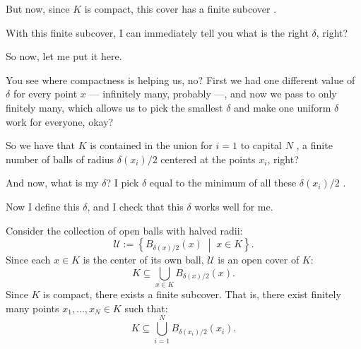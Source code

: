 \begin{proofWrapper}
\begin{speech}[01:18:10 - 01:20:08]
But now, since $K$ is compact, this cover has a finite subcover .

With this finite subcover, I can immediately tell you what is the right $\delta$, right?

So now, let me put it here.

You see where compactness is helping us, no? First we had one different value of $\delta$ for every point $x$ --- infinitely many, probably ---, and now we pass to only finitely many, which allows us to pick the smallest $\delta$ and make one uniform $\delta$ work for everyone, okay?

So we have that $K$ is contained in the union for $i = 1$ to capital $N$ , a finite number of balls of radius $\delta(x_i)/2$ centered at the points $x_i$, right?

And now, what is my $\delta$? I pick $\delta$ equal to the minimum of all these $\delta(x_i)/2$ .

Now I define this $\delta$, and I check that this $\delta$ works well for me.
\end{speech}

\begin{hidden}
\end{hidden}

\begin{content}
Consider the collection of open balls with halved radii:
\begin{equation}\label{eq:open-cover-halved}
\mathcal{U} := \left\{ B_{\delta(x)/2}(x) \;\middle|\; x \in K \right\}.
\end{equation}
Since each $x \in K$ is the center of its own ball, $\mathcal{U}$ is an open cover of $K$:
\[
K \subseteq \bigcup_{x \in K} B_{\delta(x)/2}(x).
\]
Since $K$ is compact, there exists a finite subcover. That is, there exist finitely many points $x_1, \dots, x_N \in K$ such that:
\begin{equation}\label{eq:finite-subcover-heine}
K \subseteq \bigcup_{i=1}^N B_{\delta(x_i)/2}(x_i).
\end{equation}


\end{content}
\end{proofWrapper}
